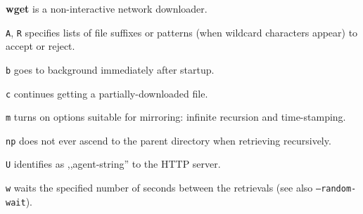 \textbf{wget} is a non-interactive network downloader.
\begin{enumx}
	\item [\texttt{A}, \texttt{R}] specifies lists 	of file suffixes or 
	patterns (when wildcard characters appear) to accept or reject.
	\item [\texttt{b}] goes to background immediately after startup.
	\item [\texttt{c}] continues getting a partially-downloaded file.
	\item [\texttt{m}] turns on options suitable for mirroring: infinite recursion and time-stamping.
	\item [\texttt{np}] does not ever ascend to the parent directory when retrieving recursively.
	\item [\texttt{U}] identifies as ,,agent-string'' to the HTTP server.
	\item [\texttt{w}] waits the specified number of seconds between the retrievals (see also \texttt{--random-wait}).
\end{enumx}